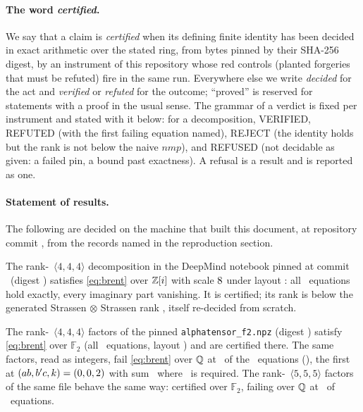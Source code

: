 \documentclass[11pt]{article}
\newcommand{\F}{\mathbb{F}}
\newcommand{\mm}[3]{\langle #1,#2,#3\rangle}
\begin{document}
\paragraph{The word \emph{certified}.} We say that a claim is \emph{certified} when its defining finite
identity has been decided in exact arithmetic over the stated ring, from bytes pinned by their SHA-256
digest, by an instrument of this repository whose red controls (planted forgeries that must be refuted) fire
in the same run. Everywhere else we write \emph{decided} for the act and \emph{verified} or \emph{refuted}
for the outcome; ``proved'' is reserved for statements with a proof in the usual sense. The grammar of a
verdict is fixed per instrument and stated with it below: for a decomposition, VERIFIED, REFUTED (with the
first failing equation named), REJECT (the identity holds but the rank is not below the naive $nmp$), and
REFUSED (not decidable as given: a failed pin, a bound past exactness). A refusal is a result and is
reported as one.

\paragraph{Statement of results.} The following are decided on the machine that built this document, at
repository commit \texttt{\RepoCommit}, from the records named in the reproduction section.

\begin{proposition}[AlphaEvolve]\label{prop:ae}
The rank-\AERank\ $\mm444$ decomposition in the DeepMind notebook pinned at commit \AECommit\ (digest
\AEPin) satisfies \eqref{eq:brent} over $\mathbb{Z}[i]$ with scale $8$ under layout \AELayout: all
\AEEquations\ equations hold exactly, every imaginary part vanishing. It is certified; its rank is below
the generated Strassen$\,\otimes\,$Strassen rank \StrassenSqRank, itself re-decided from scratch.
\end{proposition}

\begin{proposition}\label{prop:at}
The rank-\ATRank\ $\mm444$ factors of the pinned \texttt{alphatensor\_f2.npz} (digest \ATPinF) satisfy
\eqref{eq:brent} over $\F_2$ (all \ATEquations\ equations, layout \ATLayout) and are certified there. The
same factors, read as integers, fail \eqref{eq:brent} over $\mathbb{Q}$ at \ATQFailCount\ of the \ATEquations\
equations (\ATQFailPct), the first at $(ab,b'c,k)=(0,0,2)$ with sum \ATQFailSum\
where \ATQFailTarget\ is required. The rank-\ATFiveRank\ $\mm555$ factors of the same file behave the same
way: certified over $\F_2$, failing over $\mathbb{Q}$ at \ATFiveQFailCount\ of \ATFiveEquations\ equations.
\end{proposition}
\end{document}
